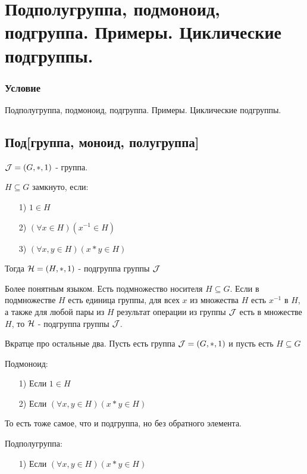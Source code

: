 \documentclass{report}
\begin{document}
\newpage

\section{Подполугруппа, подмоноид, подгруппа. Примеры. Циклические подгруппы.}
\subsubsection{Условие}
Подполугруппа, подмоноид, подгруппа. Примеры. Циклические подгруппы.

\subsection{Под[группа, моноид, полугруппа]}
${\cal J} = (G, *, 1)$ - группа.

\medskip

$H \subseteq G$ замкнуто, если:
\begin{itemize}
    \item[1)] $1 \in H$
    \item[2)] $(\forall x \in H)(x^{-1} \in H)$
    \item[3)] $(\forall x,y \in H)(x * y \in H)$
\end{itemize}

Тогда ${\cal H} = (H, *, 1)$ - подгруппа группы $\cal J$


Более понятным языком. Есть подмножество носителя $H \subseteq G$. Если в подмножестве
$H$ есть единица группы, для всех $x$ из множества $H$ есть $x^{-1}$ в $H$, а также
для любой пары из $H$ результат операции из группы $\cal J$ есть в множестве $H$, то
${\cal H}$ - подгруппа группы $\cal J$.

\medskip

Вкратце про остальные два. Пусть есть группа ${\cal J} = (G, *, 1)$ и пусть есть $H \subseteq G$

Подмоноид:
\begin{itemize}
    \item[1)] Если $1 \in H$
    \item[2)] Если $(\forall x,y \in H)(x * y \in H)$
\end{itemize}

То есть тоже самое, что и подгруппа, но без обратного элемента.

\medskip

Подполугруппа:
\begin{itemize}
    \item[1)] Если $(\forall x,y \in H)(x * y \in H)$
\end{itemize}
\end{document}
